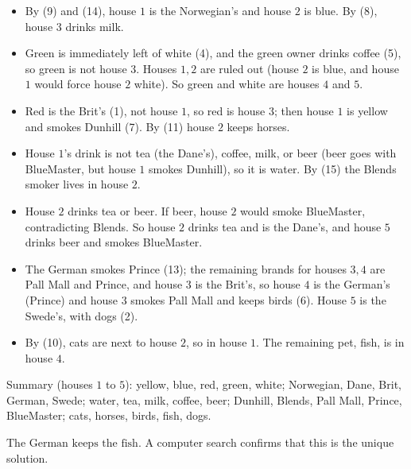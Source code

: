 \begin{itemize}
\item By (9) and (14), house $1$ is the Norwegian's and house $2$ is blue. By (8), house $3$ drinks milk.
\item Green is immediately left of white (4), and the green owner drinks coffee (5), so green is not house $3$. Houses $1,2$ are ruled out (house $2$ is blue, and house $1$ would force house $2$ white). So green and white are houses $4$ and $5$.
\item Red is the Brit's (1), not house $1$, so red is house $3$; then house $1$ is yellow and smokes Dunhill (7). By (11) house $2$ keeps horses.
\item House $1$'s drink is not tea (the Dane's), coffee, milk, or beer (beer goes with BlueMaster, but house $1$ smokes Dunhill), so it is water. By (15) the Blends smoker lives in house $2$.
\item House $2$ drinks tea or beer. If beer, house $2$ would smoke BlueMaster, contradicting Blends. So house $2$ drinks tea and is the Dane's, and house $5$ drinks beer and smokes BlueMaster.
\item The German smokes Prince (13); the remaining brands for houses $3,4$ are Pall Mall and Prince, and house $3$ is the Brit's, so house $4$ is the German's (Prince) and house $3$ smokes Pall Mall and keeps birds (6). House $5$ is the Swede's, with dogs (2).
\item By (10), cats are next to house $2$, so in house $1$. The remaining pet, fish, is in house $4$.
\end{itemize}
Summary (houses $1$ to $5$): yellow, blue, red, green, white; Norwegian, Dane, Brit, German, Swede; water, tea, milk, coffee, beer; Dunhill, Blends, Pall Mall, Prince, BlueMaster; cats, horses, birds, fish, dogs.

$\boxed{\text{The German keeps the fish.}}$ A computer search confirms that this is the unique solution.
